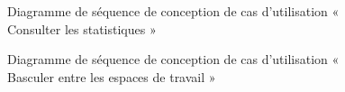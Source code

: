 \begin{figure}[H]
  \centering
  \caption{Diagramme de séquence de conception de cas d'utilisation « Consulter les statistiques »}
  \label{fig:sequence_conception_consulter_statistiques}
\end{figure}

\begin{figure}[H]
  \centering
  \caption{Diagramme de séquence de conception de cas d'utilisation « Basculer entre les espaces de travail »}
  \label{fig:sequence_conception_sequence_switch_workspace}
\end{figure}


